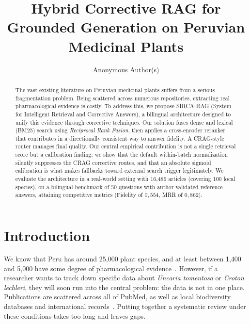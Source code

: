 \documentclass[runningheads]{llncs}
\title{Hybrid Corrective RAG for Grounded Generation
on Peruvian Medicinal Plants}
\author{Anonymous Author(s)}
\institute{Affiliation withheld for double-blind review}
\newcommand{\sirca}{\textsc{SIRCA-RAG}}
\begin{document}
\sloppy
\maketitle

\begin{abstract}
The vast existing literature on Peruvian medicinal plants suffers from a serious fragmentation problem. Being scattered across numerous repositories, extracting real pharmacological evidence is costly. To address this, we propose \sirca{} (System for Intelligent Retrieval and Corrective Answers), a bilingual architecture designed to unify this evidence through corrective techniques. Our solution fuses dense and lexical (BM25) search using \emph{Reciprocal Rank Fusion}, then applies a cross-encoder reranker that contributes in a directionally consistent way to answer fidelity. A CRAG-style router manages final quality. Our central empirical contribution is not a single retrieval score but a calibration finding: we show that the default within-batch normalization silently suppresses the CRAG corrective routes, and that an absolute sigmoid calibration is what makes fallbacks toward external search trigger legitimately. We evaluate the architecture in a real-world setting with 16{,}486 articles (covering 100 local species), on a bilingual benchmark of 50 questions with author-validated reference answers, attaining competitive metrics (Fidelity of $0{,}554$, MRR of $0{,}862$).

\end{abstract}

\section{Introduction}
\label{sec:intro}

We know that Peru has around 25{,}000 plant species, and at least between 1{,}400 and 5{,}000 have some degree of pharmacological evidence~\cite{bussmann2006traditional,bussmann2011toxicity}. However, if a researcher wants to track down specific data about \textit{Uncaria tomentosa} or \textit{Croton lechleri}, they will soon run into the central problem: the data is not in one place. Publications are scattered across all of PubMed, as well as local biodiversity databases and international records~\cite{lock2016bioactive,gonzales2012ethnobiology}. Putting together a systematic review under these conditions takes too long and leaves gaps.
\end{document}
